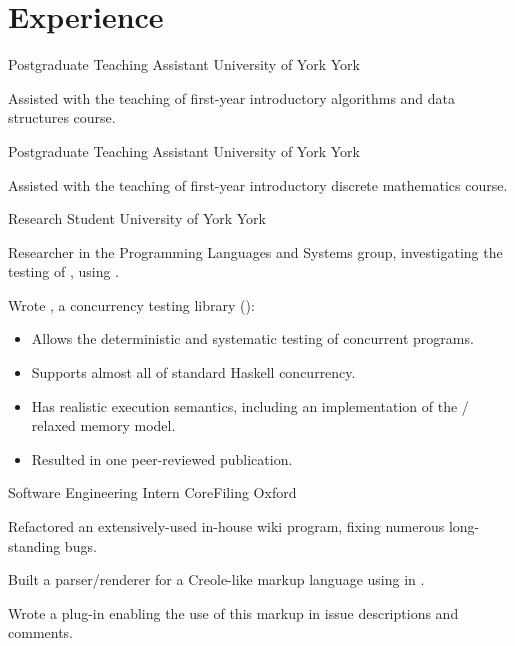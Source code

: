 \documentclass[a4paper]{barrucadu-cv}
\begin{document}
\section{Experience}

  {Postgraduate Teaching Assistant}
  {University of York}
  {York}
  {\begin{tightitemize}
    \item Assisted with the teaching of first-year introductory
      algorithms and data structures course.
    \end{tightitemize}}

  {Postgraduate Teaching Assistant}
  {University of York}
  {York}
  {\begin{tightitemize}
    \item Assisted with the teaching of first-year introductory
      discrete mathematics course.
    \end{tightitemize}}

  {Research Student}
  {University of York}
  {York}
  {\begin{tightitemize}
    \item Researcher in the Programming Languages and Systems group,
      investigating the testing of ,
      using .
    \item Wrote , a concurrency testing library
      ():
      \begin{itemize}
      \item Allows the deterministic and systematic testing of
        concurrent  programs.
      \item Supports almost all of standard Haskell concurrency.
      \item Has realistic execution semantics, including an
        implementation of the  / 
        relaxed memory model.
      \item Resulted in one peer-reviewed publication.
      \end{itemize}
    \end{tightitemize}}

  {Software Engineering Intern}
  {CoreFiling}
  {Oxford}
  {\begin{tightitemize}
    \item Refactored an extensively-used in-house wiki program, fixing
      numerous long-standing bugs.
    \item Built a parser/renderer for a Creole-like markup language
      using  in .
    \item Wrote a  plug-in enabling the use of this
      markup in issue descriptions and comments.
    \end{tightitemize}}
\end{document}
